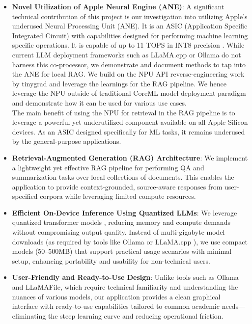\begin{itemize}
    
    \item \textbf{Novel Utilization of Apple Neural Engine (ANE)}: A significant technical contribution of this project is our investigation into utilizing Apple’s underused Neural Processing Unit (ANE). It is an ASIC (Application Specific Integrated Circuit) with capabilities designed for performing machine learning specific operations. It is capable of up to 11 TOPS in INT8 precision \cite{apple2024ane}. While current LLM deployment frameworks such as LLaMA.cpp \cite{llamacpp2023} or Ollama\cite{ollama2023} do not harness this co-processor, we demonstrate and document methods to tap into the ANE for local RAG. We build on the NPU API reverse-engineering work by tinygrad \cite{tinygrad2023ane} and leverage the learnings for the RAG pipeline. We hence leverage the NPU outside of traditional CoreML model deployment paradigm and demonstrate how it can be used for various use cases.\\
    
    The main benefit of using the NPU for retrieval in the RAG pipeline is to leverage a powerful yet underutilized component available on all Apple Silicon devices. As an ASIC designed specifically for ML tasks, it remains underused by the general-purpose applications.

    \item \textbf{Retrieval-Augmented Generation (RAG) Architecture}: We implement a lightweight yet effective RAG pipeline \cite{lewis2020rag} for performing QA and summarization tasks over local collections of documents. This enables the application to provide context-grounded, source-aware responses from user-specified corpora while leveraging limited compute resources.

    \item \textbf{Efficient On-Device Inference Using Quantized LLMs}: We leverage quantized transformer models \cite{jacob2017quantization}, reducing memory and compute demands without compromising output quality. Instead of multi-gigabyte model downloads (as required by tools like Ollama \cite{ollama2023} or LLaMA.cpp \cite{llamacpp2023}), we use compact models (50–500MB) that support practical usage scenarios with minimal setup, enhancing portability and usability for non-technical users.

    \item \textbf{User-Friendly and Ready-to-Use Design}: Unlike tools such as Ollama \cite{ollama2023} and LLaMAFile\cite{llamafile2023}, which require technical familiarity and understanding the nuances of various models, our application provides a clean graphical interface with ready-to-use capabilities tailored to common academic needs—eliminating the steep learning curve and reducing operational friction.
    

\end{itemize}
